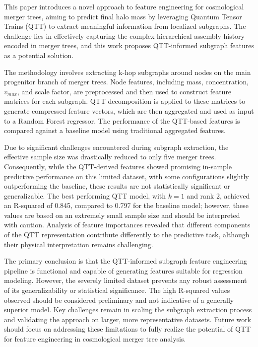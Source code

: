\documentclass[twocolumn]{aastex631}
\begin{document}
This paper introduces a novel approach to feature engineering for cosmological merger trees, aiming to predict final halo mass by leveraging Quantum Tensor Trains (QTT) to extract meaningful information from localized subgraphs. The challenge lies in effectively capturing the complex hierarchical assembly history encoded in merger trees, and this work proposes QTT-informed subgraph features as a potential solution.

The methodology involves extracting k-hop subgraphs around nodes on the main progenitor branch of merger trees. Node features, including mass, concentration, \(v_{max}\), and scale factor, are preprocessed and then used to construct feature matrices for each subgraph. QTT decomposition is applied to these matrices to generate compressed feature vectors, which are then aggregated and used as input to a Random Forest regressor. The performance of the QTT-based features is compared against a baseline model using traditional aggregated features.

Due to significant challenges encountered during subgraph extraction, the effective sample size was drastically reduced to only five merger trees. Consequently, while the QTT-derived features showed promising in-sample predictive performance on this limited dataset, with some configurations slightly outperforming the baseline, these results are not statistically significant or generalizable. The best performing QTT model, with \(k=1\) and rank 2, achieved an R-squared of 0.845, compared to 0.797 for the baseline model; however, these values are based on an extremely small sample size and should be interpreted with caution. Analysis of feature importances revealed that different components of the QTT representation contribute differently to the predictive task, although their physical interpretation remains challenging.

The primary conclusion is that the QTT-informed subgraph feature engineering pipeline is functional and capable of generating features suitable for regression modeling. However, the severely limited dataset prevents any robust assessment of its generalizability or statistical significance. The high R-squared values observed should be considered preliminary and not indicative of a generally superior model. Key challenges remain in scaling the subgraph extraction process and validating the approach on larger, more representative datasets. Future work should focus on addressing these limitations to fully realize the potential of QTT for feature engineering in cosmological merger tree analysis.

{}

\end{document}
